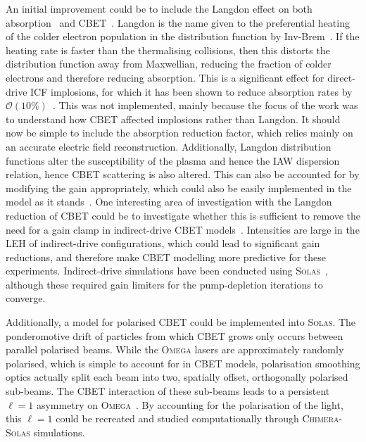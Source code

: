 An initial improvement could be to include the Langdon effect on both absorption~\cite{turnbull_inverse_2023} and \ac{CBET}~\cite{turnbull_impact_2020}.
Langdon is the name given to the preferential heating of the colder electron population in the distribution function by \ac{Inv-Brem}~\cite{langdon_nonlinear_1980}.
If the heating rate is faster than the thermalising collisions, then this distorts the distribution function away from Maxwellian, reducing the fraction of colder electrons and therefore reducing absorption.
This is a significant effect for direct-drive \ac{ICF} implosions, for which it has been shown to reduce absorption rates by $\mathcal{O}(10\%)$~\cite{turnbull_inverse_2023}.
This was not implemented, mainly because the focus of the work was to understand how \ac{CBET} affected implosions rather than Langdon.
It should now be simple to include the absorption reduction factor, which relies mainly on an accurate electric field reconstruction.
Additionally, Langdon distribution functions alter the susceptibility of the plasma and hence the \ac{IAW} dispersion relation, hence \ac{CBET} scattering is also altered.
This can also be accounted for by modifying the gain appropriately, which could also be easily implemented in the model as it stands~\cite{turnbull_impact_2020}.
One interesting area of investigation with the Langdon reduction of \ac{CBET} could be to investigate whether this is sufficient to remove the need for a gain clamp in indirect-drive \ac{CBET} models~\cite{michel_tuning_2009}.
Intensities are large in the \ac{LEH} of indirect-drive configurations, which could lead to significant gain reductions, and therefore make \ac{CBET} modelling more predictive for these experiments.
Indirect-drive simulations have been conducted using \textsc{Solas}~\cite{chittenden_crossbeam_2024}, although these required gain limiters for the pump-depletion iterations to converge.

Additionally, a model for polarised \ac{CBET} could be implemented into \textsc{Solas}.
The ponderomotive drift of particles from which \ac{CBET} grows only occurs between parallel polarised beams.
While the \textsc{Omega} lasers are approximately randomly polarised, which is simple to account for in \ac{CBET} models, polarisation smoothing optics actually split each beam into two, spatially offset, orthogonally polarised sub-beams.
The \ac{CBET} interaction of these sub-beams leads to a persistent $\ell=1$ asymmetry on \textsc{Omega}~\cite{mannion_mitigation_2021,edgell_nonuniform_2021,colaitis_3d_2022}.
By accounting for the polarisation of the light, this $\ell=1$ could be recreated and studied computationally through \textsc{Chimera}-\textsc{Solas} simulations.


